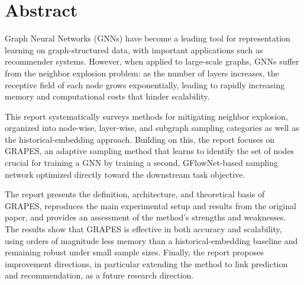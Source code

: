 \chapter*{Abstract}

Graph Neural Networks (GNNs) have become a leading tool for representation learning on graph-structured data, with important applications such as recommender systems. However, when applied to large-scale graphs, GNNs suffer from the neighbor explosion problem: as the number of layers increases, the receptive field of each node grows exponentially, leading to rapidly increasing memory and computational costs that hinder scalability.

This report systematically surveys methods for mitigating neighbor explosion, organized into node-wise, layer-wise, and subgraph sampling categories as well as the historical-embedding approach. Building on this, the report focuses on GRAPES, an adaptive sampling method that learns to identify the set of nodes crucial for training a GNN by training a second, GFlowNet-based sampling network optimized directly toward the downstream task objective.

The report presents the definition, architecture, and theoretical basis of GRAPES, reproduces the main experimental setup and results from the original paper, and provides an assessment of the method's strengths and weaknesses. The results show that GRAPES is effective in both accuracy and scalability, using orders of magnitude less memory than a historical-embedding baseline and remaining robust under small sample sizes. Finally, the report proposes improvement directions, in particular extending the method to link prediction and recommendation, as a future research direction.

